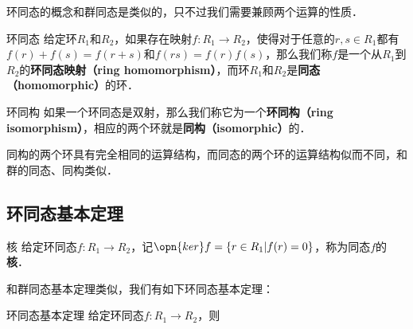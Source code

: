 

环同态的概念和群同态是类似的，只不过我们需要兼顾两个运算的性质．


\begin{definition}{环同态}
给定环$R_1$和$R_2$，如果存在映射$f:R_1\rightarrow R_2$，使得对于任意的$r, s\in R_1$都有$f(r)+f(s)=f(r+s)$和$f(rs)=f(r)f(s)$，那么我们称$f$是一个从$R_1$到$R_2$的\textbf{环同态映射（ring homomorphism）}，而环$R_1$和$R_2$是\textbf{同态（homomorphic）}的环．
\end{definition}

\begin{definition}{环同构}
如果一个环同态是双射，那么我们称它为一个\textbf{环同构（ring isomorphism）}，相应的两个环就是\textbf{同构（isomorphic）}的．
\end{definition}

同构的两个环具有完全相同的运算结构，而同态的两个环的运算结构似而不同，和群的同态、同构类似．

\subsection{环同态基本定理}

\begin{definition}{核}
给定环同态$f:R_1\rightarrow R_2$，记$\opn{ker}f=\{r\in R_1|f(r)=0\}$，称为同态$f$的\textbf{核}．
\end{definition}


和群同态基本定理类似，我们有如下环同态基本定理：

\begin{definition}{环同态基本定理}
给定环同态$f:R_1\rightarrow R_2$，则
\end{definition}






